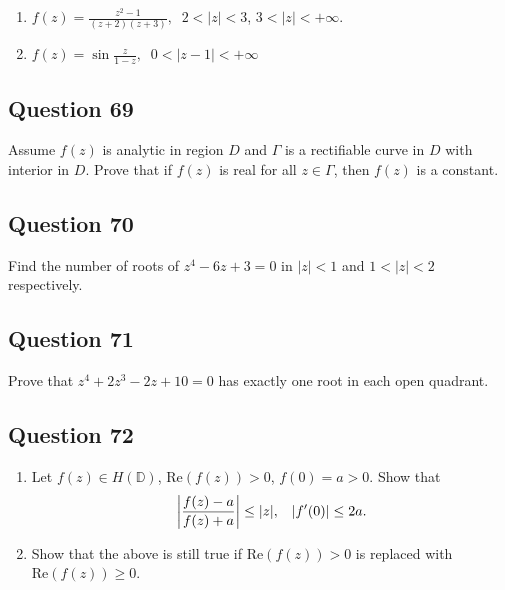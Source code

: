 \documentclass[12pt]{article}
\begin{document}
\begin{enumerate}
\def\labelenumi{(\alph{enumi})}
\item
  \(\displaystyle f(z) = \frac{z^2 - 1}{ (z+2)(z+3)}, \; \; 2 < |z| < 3\),
  \(3 < |z| < + \infty\).
\item
  \(\displaystyle f(z) = \sin \frac{z}{1-z}, \; \; 0 < |z-1| < + \infty\)
\end{enumerate}

\hypertarget{question-69-2}{%
\subsection{Question 69}\label{question-69-2}}

Assume \(f(z)\) is analytic in region \(D\) and \(\Gamma\) is a
rectifiable curve in \(D\) with interior in \(D\). Prove that if
\(f(z)\) is real for all \(z \in \Gamma\), then \(f(z)\) is a constant.

\hypertarget{question-70-2}{%
\subsection{Question 70}\label{question-70-2}}

Find the number of roots of \(z^4 - 6z + 3 =0\) in \(|z|<1\) and
\(1 < |z| < 2\) respectively.

\hypertarget{question-71-2}{%
\subsection{Question 71}\label{question-71-2}}

Prove that \(z^4 + 2 z^3 - 2z + 10 =0\) has exactly one root in each
open quadrant.

\hypertarget{question-72-2}{%
\subsection{Question 72}\label{question-72-2}}

\begin{enumerate}
\def\labelenumi{(\arabic{enumi})}
\item
  Let \(f(z) \in H({\mathbb D})\), \(\text{Re}(f(z)) >0\),
  \(f(0)= a>0\). Show that
  \[{\left\lvert { \frac{f(z)-a}{f(z)+a}} \right\rvert} \leq |z|, \; \; \;
  |f'(0)| \leq 2a.\]
\item
  Show that the above is still true if \(\text{Re}(f(z)) >0\) is
  replaced with \(\text{Re}(f(z)) \geq 0\).
\end{enumerate}
\end{document}
